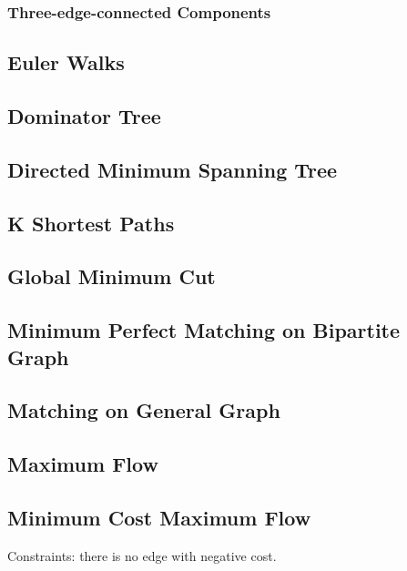 \documentclass{article}
\begin{document}
\begin{multicols}{2}
    \subsubsection{Three-edge-connected Components}
    

    \subsection{Euler Walks}
    

    \subsection{Dominator Tree}
    

    \subsection{Directed Minimum Spanning Tree}
    

    \subsection{K Shortest Paths}
    

    \subsection{Global Minimum Cut}
    

    \subsection{Minimum Perfect Matching on Bipartite Graph}
    

    \subsection{Matching on General Graph}
    

    \subsection{Maximum Flow}
    

    \subsection{Minimum Cost Maximum Flow}
    Constraints: there is no edge with negative cost.
    



\end{multicols}
\end{document}
